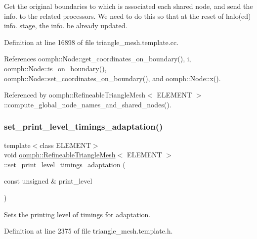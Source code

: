 Get the original boundaries to which is associated each shared node, and send the info. to the related processors. We need to do this so that at the reset of halo(ed) info. stage, the info. be already updated. 



Definition at line 16898 of file triangle\+\_\+mesh.\+template.\+cc.



References oomph\+::\+Node\+::get\+\_\+coordinates\+\_\+on\+\_\+boundary(), i, oomph\+::\+Node\+::is\+\_\+on\+\_\+boundary(), oomph\+::\+Node\+::set\+\_\+coordinates\+\_\+on\+\_\+boundary(), and oomph\+::\+Node\+::x().



Referenced by oomph\+::\+Refineable\+Triangle\+Mesh$<$ E\+L\+E\+M\+E\+N\+T $>$\+::compute\+\_\+global\+\_\+node\+\_\+names\+\_\+and\+\_\+shared\+\_\+nodes().

\mbox{\label{classoomph_1_1RefineableTriangleMesh_a3580283bfa7acd135e294051890c62a4}} 
\subsubsection{\texorpdfstring{set\+\_\+print\+\_\+level\+\_\+timings\+\_\+adaptation()}{set\_print\_level\_timings\_adaptation()}}
{\footnotesize\ttfamily template$<$class E\+L\+E\+M\+E\+NT$>$ \\
void \hyperlink{classoomph_1_1RefineableTriangleMesh}{oomph\+::\+Refineable\+Triangle\+Mesh}$<$ E\+L\+E\+M\+E\+NT $>$\+::set\+\_\+print\+\_\+level\+\_\+timings\+\_\+adaptation (\begin{DoxyParamCaption}\item[{const unsigned \&}]{print\+\_\+level }\end{DoxyParamCaption})\hspace{0.3cm}{\ttfamily [inline]}}



Sets the printing level of timings for adaptation. 



Definition at line 2375 of file triangle\+\_\+mesh.\+template.\+h.

